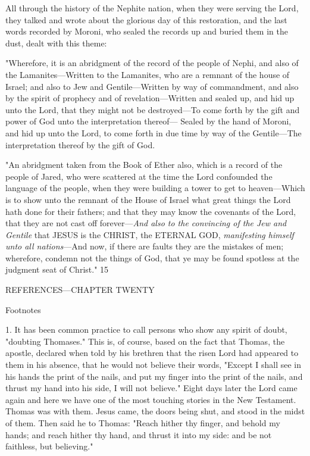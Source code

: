 All through the history of the Nephite nation, when they were serving the Lord, they talked
and wrote about the glorious day of this restoration, and the last words recorded by Moroni,
who sealed the records up and buried them in the dust, dealt with this theme:

"Wherefore, it is an abridgment of the record of the people of Nephi, and also of the
Lamanites—Written to the Lamanites, who are a remnant of the house of Israel; and also to
Jew and Gentile—Written by way of commandment, and also by the spirit of prophecy and
of revelation—Written and sealed up, and hid up unto the Lord, that they might not be
destroyed—To come forth by the gift and power of God unto the interpretation thereof—
Sealed by the hand of Moroni, and hid up unto the Lord, to come forth in due time by way of
the Gentile—The interpretation thereof by the gift of God.

"An abridgment taken from the Book of Ether also, which is a record of the people of Jared,
who were scattered at the time the Lord confounded the language of the people, when they
were building a tower to get to heaven—Which is to show unto the remnant of the House of
Israel what great things the Lord hath done for their fathers; and that they may know the
covenants of the Lord, that they are not cast off forever—\textit{And also to the convincing of the
Jew and Gentile} that JESUS is the CHRIST, the ETERNAL GOD, \textit{manifesting himself unto
all nations}—And now, if there are faults they are the mistakes of men; wherefore, condemn
not the things of God, that ye may be found spotless at the judgment seat of Christ." 15

\newpage
REFERENCES—CHAPTER TWENTY

Footnotes

1. It has been common practice to call persons who show any spirit of doubt, "doubting
Thomases." This is, of course, based on the fact that Thomas, the apostle, declared when told
by his brethren that the risen Lord had appeared to them in his absence, that he would not
believe their words, "Except I shall see in his hands the print of the nails, and put my finger
into the print of the nails, and thrust my hand into his side, I will not believe." Eight days
later the Lord came again and here we have one of the most touching stories in the New
Testament. Thomas was with them. Jesus came, the doors being shut, and stood in the midst
of them. Then said he to Thomas: "Reach hither thy finger, and behold my hands; and reach
hither thy hand, and thrust it into my side: and be not faithless, but believing."

